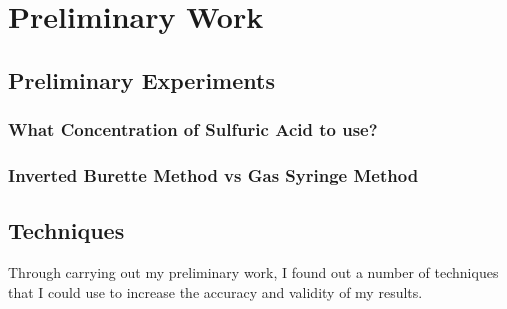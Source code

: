 \chapter {Preliminary Work}

\section {Preliminary Experiments}

	\subsection {What Concentration of Sulfuric Acid to use?}


	\subsection{Inverted Burette Method vs Gas Syringe Method}

\section {Techniques}

Through carrying out my preliminary work, I found out a number of techniques that I could use to increase the accuracy and validity of my results.